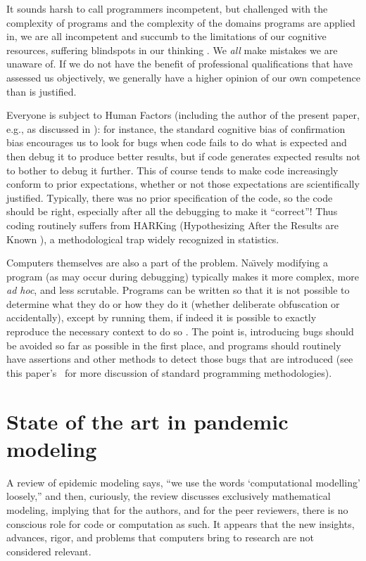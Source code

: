 It sounds harsh to call programmers incompetent, but challenged with the complexity of programs and the complexity of the domains programs are applied in, we are all incompetent and succumb to the limitations of our cognitive resources, suffering blindspots in our thinking \cite{fixit}. We \emph{all\/} make mistakes we are unaware of. If we do not have the benefit of professional qualifications that have assessed us objectively, we generally have a higher opinion of our own competence than is justified.

{Everyone is subject to Human Factors (including the author of the present paper, e.g., as discussed in \cite{enigma}): for instance, the standard cognitive bias of confirmation bias encourages us to look for bugs when code fails to do what is expected and then debug it to produce better results, but if code generates expected results not to bother to debug it further. This of course tends to make code increasingly conform to prior expectations, whether or not those expectations are scientifically justified. Typically, there was no prior specification of the code, so the code should be right, especially after all the debugging to make it ``correct''! Thus coding routinely suffers from HARKing (Hypothesizing After the Results are Known \cite{harking}), a methodological trap widely recognized in statistics.}

Computers themselves are also a part of the problem. Na\"\i vely modifying a program (as may occur during debugging) typically makes it more complex, more \emph{ad hoc}, and less scrutable. Programs can be written so that it is not possible to determine what they do or how they do it (whether deliberate obfuscation or accidentally), except by running them, if indeed it is possible to exactly reproduce the necessary context to do so \cite{framework}. The point is, introducing bugs should be avoided so far as possible in the first place, and programs should routinely have assertions and other methods to detect those bugs that are introduced (see this paper's \supplement\ for more discussion of standard programming methodologies).
\fi

\section{State of the art in pandemic modeling}
A review of epidemic modeling \cite{science-review} says, ``we use the words `computational modelling' loosely,'' and then, curiously, the review discusses exclusively mathematical modeling, implying that for the authors, and for the peer reviewers, there is no conscious role for code or computation as such. It appears that the new insights, advances, rigor, and problems that computers bring to research are not considered relevant. 

